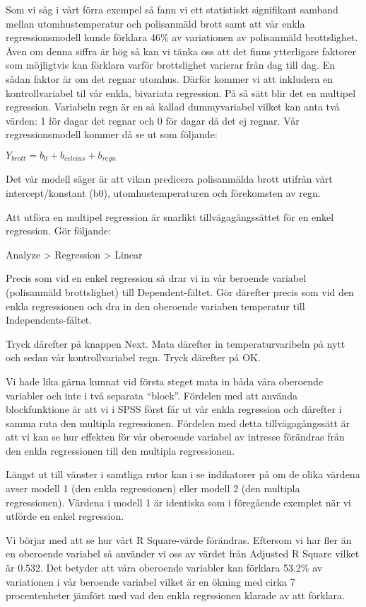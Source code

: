 \documentclass[
]{book}
\begin{document}
Som vi såg i vårt förra exempel så fann vi ett statistiskt signifikant samband mellan utomhustemperatur och polisanmäld brott samt att vår enkla regressionsmodell kunde förklara 46\% av variationen av polisanmäld brottslighet. Även om denna siffra är hög så kan vi tänka oss att det finns ytterligare faktorer som möjligtvis kan förklara varför brottslighet varierar från dag till dag. En sådan faktor är om det regnar utomhus. Därför kommer vi att inkludera en kontrollvariabel til vår enkla, bivariata regression. På så sätt blir det en multipel regression. Variabeln regn är en så kallad dummyvariabel vilket kan anta två värden: 1 för dagar det regnar och 0 för dagar då det ej regnar. Vår regressionsmodell kommer då se ut som följande:

\(Y_{brott} = b_0 + b_{celcius} + b_{regn}\)

Det vår modell säger är att vikan predicera polisanmälda brott utifrån vårt intercept/konstant (b0), utomhustemperaturen och förekomsten av regn.

Att utföra en multipel regression är snarlikt tillvägagångssättet för en enkel regression. Gör följande:

Analyze \textgreater{} Regression \textgreater{} Linear

Precis som vid en enkel regression så drar vi in vår beroende variabel (polisanmäld brottslighet) till Dependent-fältet. Gör därefter precis som vid den enkla regressionen och dra in den oberoende variaben temperatur till Independents-fältet.

Tryck därefter på knappen Next. Mata därefter in temperaturvaribeln på nytt och sedan vår kontrollvariabel regn. Tryck därefter på OK.

Vi hade lika gärna kunnat vid första steget mata in båda våra oberoende variabler och inte i två separata ``block''. Fördelen med att använda blockfunktione är att vi i SPSS först får ut vår enkla regression och därefter i samma ruta den multipla regressionen. Fördelen med detta tillvägagångssätt är att vi kan se hur effekten för vår oberoende variabel av intresse förändras från den enkla regressionen till den multipla regressionen.

Längst ut till vänster i samtliga rutor kan i se indikatorer på om de olika värdena avser modell 1 (den enkla regressionen) eller modell 2 (den multipla regressionen). Värdena i modell 1 är identiska som i föregående exemplet när vi utförde en enkel regression.

Vi börjar med att se hur vårt R Square-värde förändras. Eftersom vi har fler än en oberoende variabel så använder vi oss av värdet från Adjusted R Square vilket är 0.532. Det betyder att våra oberoende variabler kan förklara 53.2\% av variationen i vår beroende variabel vilket är en ökning med cirka 7 procentenheter jämfört med vad den enkla regrssionen klarade av att förklara.
\end{document}
